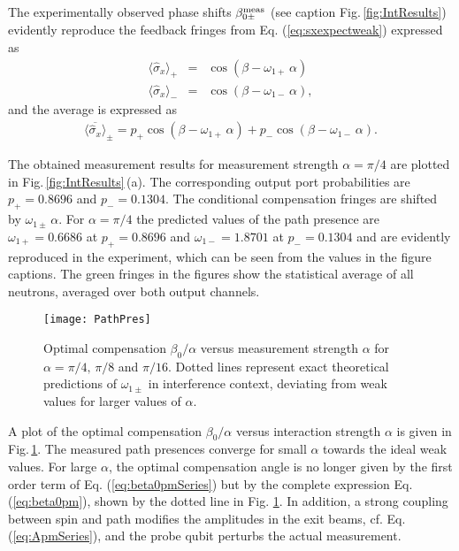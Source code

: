 \documentclass[english,keywords,aps,twocolumn]{revtex4-1}
\begin{document}
The experimentally observed phase shifts $\beta^{\rm{meas}}_{0\pm}$ (see caption Fig.\,\ref{fig:IntResults}) evidently reproduce the feedback fringes from Eq. (\ref{eq:sxexpectweak}) expressed as
\begin{eqnarray}
\langle\hat\sigma_x\rangle_+&=& \cos(\beta-\omega_{1+}\,\alpha)\nonumber\\
\langle\hat\sigma_x\rangle_-&=& \cos(\beta-\omega_{1-}\,\alpha),
\end{eqnarray}
and the average is expressed as
\begin{eqnarray}
\overline{\langle\hat\sigma_x\rangle}_{\pm}= p_+\cos(\beta-\omega_{1+}\,\alpha)+p_-\cos(\beta-\omega_{1-}\,\alpha).
\end{eqnarray}

The obtained measurement results for measurement strength $\alpha=\pi/4$ are plotted in Fig.\,\ref{fig:IntResults}\,(a).
The corresponding output port probabilities are  
$p_+=0.8696$ and $p_-=0.1304$. 
The conditional compensation fringes are shifted by $\omega_{1\pm}\,\alpha$. For $\alpha=\pi/4$ the predicted values of the path presence are 
$\omega_{1+} = 0.6686$ at $p_+ = 0.8696$ and
$\omega_{1-}= 1.8701$ at $p_- = 0.1304$ 
and are evidently reproduced in the experiment, which can be seen from the values in the figure captions.
 The green fringes in the figures show the statistical average of all neutrons, averaged over both output channels. 
%

\begin{figure}[!t]
\texttt{[image: PathPres]}
	\caption{Optimal compensation $\beta_0/\alpha$ versus measurement strength $\alpha$ for $\alpha=\pi/4,\,\pi/8$ and $\pi/16$. Dotted lines represent exact theoretical predictions of $\omega_{1\pm}$ in interference context, deviating from weak values for larger values of $\alpha$. }\label{fig:pp}
	\end{figure}
	


A plot of the optimal compensation $\beta_0/\alpha$ versus interaction strength $\alpha$ is given in Fig.\,\ref{fig:pp}. The measured path presences converge for small $\alpha$ towards the ideal weak values. For large $\alpha$, the optimal compensation angle is no longer given by the first order term of Eq. (\ref{eq:beta0pmSeries}) but by the complete expression Eq. (\ref{eq:beta0pm}), shown by the dotted line in Fig. \ref{fig:pp}. In addition, a strong coupling between spin and path modifies the amplitudes in the exit beams, cf. Eq. (\ref{eq:ApmSeries}), and the probe qubit perturbs the actual measurement.
\end{document}
